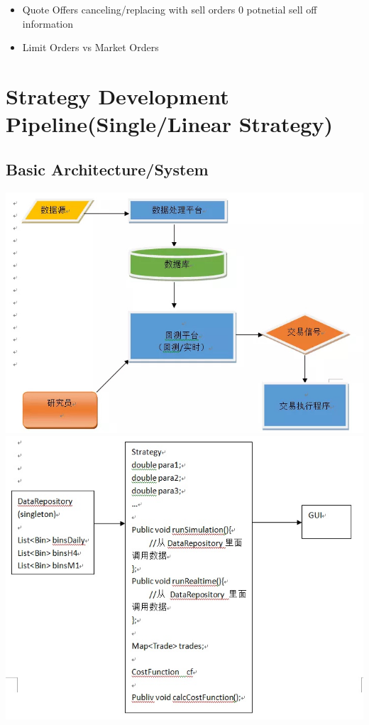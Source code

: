 \documentclass[11pt, openany]{book}              %
\begin{document}
\begin{itemize}
 \item Quote Offers canceling/replacing with sell orders 0 potnetial sell off information
 \item Limit Orders vs Market Orders 
\end{itemize}

\section{ Strategy Development Pipeline(Single/Linear Strategy) }
\subsection{Basic Architecture/System}
\includegraphics[scale=0.5]{1.JPG}
\includegraphics[scale=0.5]{2.JPG}
\end{document}
